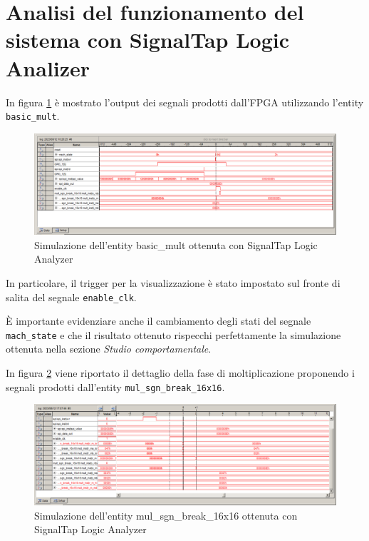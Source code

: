 \documentclass[titlepage]{report}
\begin{document}
	\section*{Analisi del funzionamento del sistema con SignalTap Logic Analizer}
	\label{sec:SignalTap}
		In figura \ref{fig:quartus_sim_signaltap} è mostrato l'output dei segnali prodotti dall'FPGA utilizzando l'entity \texttt{basic\_mult}.

		\begin{figure}[H]
			\centering
			\includegraphics[scale=0.4]{./img/signaltap_multiply_empty.png}
			\caption{Simulazione dell'entity basic\_mult ottenuta con SignalTap Logic Analyzer}
			\label{fig:quartus_sim_signaltap}
		\end{figure}

		In particolare, il trigger per la visualizzazione è stato impostato sul fronte di salita del segnale \texttt{enable\_clk}.
		
		È importante evidenziare anche il cambiamento degli stati del segnale \texttt{mach\_state} e che il risultato ottenuto rispecchi perfettamente la simulazione ottenuta nella sezione \textit{Studio comportamentale}.

		In figura \ref*{fig:quartus_sim_signaltap2} viene riportato il dettaglio della fase di moltiplicazione proponendo i segnali prodotti dall'entity \texttt{mul\_sgn\_break\_16x16}.

		\begin{figure}[H]
			\centering
			\includegraphics[scale=0.4]{./img/signaltap_multiply_step_by_step.png}
			\caption{Simulazione dell'entity mul\_sgn\_break\_16x16 ottenuta con SignalTap Logic Analyzer}
			\label{fig:quartus_sim_signaltap2}
		\end{figure}
\end{document}
